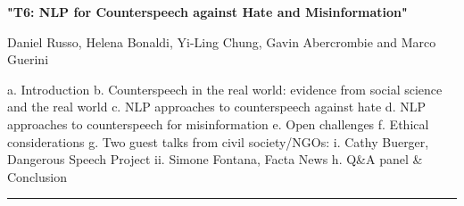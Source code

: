\begin{center}
    \Large{\textbf{"T6: NLP for Counterspeech against Hate and Misinformation"}\\}
    \par\bigskip
    \large{Daniel Russo, Helena Bonaldi, Yi-Ling Chung, Gavin Abercrombie and Marco Guerini}\\
    \par\bigskip

\end{center}

a. Introduction
b. Counterspeech in the real world: evidence from social science and the real world
c. NLP approaches to counterspeech against hate
d. NLP approaches to counterspeech for misinformation 
e. Open challenges 
f. Ethical considerations 
g. Two guest talks from civil society/NGOs:
    i. Cathy Buerger, Dangerous Speech Project
    ii. Simone Fontana, Facta News
h. Q&A panel & Conclusion

\begin{center}
    \noindent\rule{200px}{1pt}
\end{center}
